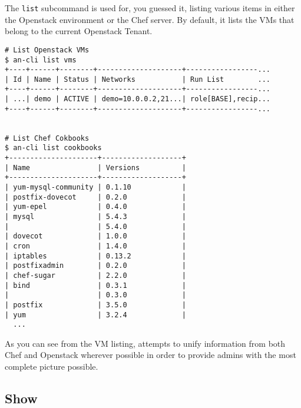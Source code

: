 \documentclass[11pt]{article}
\begin{document}
The \texttt{list} subcommand is used for, you guessed it, listing
various items in either the Openstack environment or the Chef server. By
default, it lists the VMs that belong to the current Openstack Tenant.

\begin{lstlisting}
# List Openstack VMs
$ an-cli list vms
+----+------+--------+--------------------+-----------------...
| Id | Name | Status | Networks           | Run List        ...
+----+------+--------+--------------------+-----------------...
| ...| demo | ACTIVE | demo=10.0.0.2,21...| role[BASE],recip...
+----+------+--------+--------------------+-----------------...


# List Chef Cokbooks
$ an-cli list cookbooks
+---------------------+-------------------+
| Name                | Versions          |
+---------------------+-------------------+
| yum-mysql-community | 0.1.10            |
| postfix-dovecot     | 0.2.0             |
| yum-epel            | 0.4.0             |
| mysql               | 5.4.3             |
|                     | 5.4.0             |
| dovecot             | 1.0.0             |
| cron                | 1.4.0             |
| iptables            | 0.13.2            |
| postfixadmin        | 0.2.0             |
| chef-sugar          | 2.2.0             |
| bind                | 0.3.1             |
|                     | 0.3.0             |
| postfix             | 3.5.0             |
| yum                 | 3.2.4             |
  ...
\end{lstlisting}

As you can see from the VM listing, \aN attempts to unify information from both
Chef and Openstack wherever possible in order to provide admins with the most
complete picture possible.

\subsection{Show}
\end{document}
